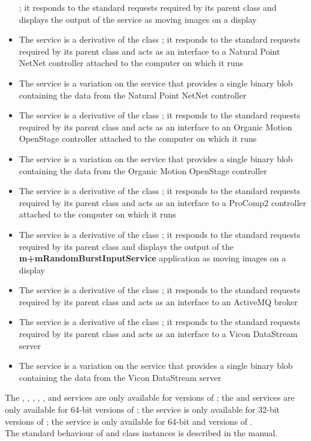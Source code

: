 \begin{itemize}
;
it responds to the standard requests required by its parent class and displays the output
of the \textbf{\LFI} service as moving images on a display
\item\exSp{}The \textbf{\NNI} service is a derivative of the \mplusm{} class
;
it responds to the standard requests required by its parent class and acts as an interface
to a Natural Point NetNet controller attached to the computer on which it runs
\item\exSp{}The \textbf{\NNBI} service is a variation on the \NNI{} service that provides
a single binary blob containing the data from the Natural Point NetNet controller
\item\exSp{}The \textbf{\OSI} service is a derivative of the \mplusm{} class
;
it responds to the standard requests required by its parent class and acts as an interface
to an Organic Motion OpenStage controller attached to the computer on which it runs
\item\exSp{}The \textbf{\OSBI} service is a variation on the \OSI{} service that provides
a single binary blob containing the data from the Organic Motion OpenStage controller
\item\exSp{}The \textbf{\PCtwoI} service is a derivative of the \mplusm{} class
;
it responds to the standard requests required by its parent class and acts as an interface
to a ProComp2 controller attached to the computer on which it runs
\item\exSp{}The \textbf{\PDO} service is a derivative of the \mplusm{} class
;
it responds to the standard requests required by its parent class and displays the output
of the \textbf{m+mRandomBurstInputService} application as moving images on a display
\item\exSp{}The \textbf{\SMO} service is a derivative of the \mplusm{} class
;
it responds to the standard requests required by its parent class and acts as an interface
to an ActiveMQ broker
\item\exSp{}The \textbf{\VDSI} service is a derivative of the \mplusm{} class
;
it responds to the standard requests required by its parent class and acts as an interface
to a Vicon DataStream server
\item\exSp{}The \textbf{\VBI} service is a variation on the \VDSI{} service that provides
a single binary blob containing the data from the Vicon DataStream server
\end{itemize}

The \KVtwoI, \KVtwoBI, \KVtwoSI, \NNI, \NNBI, \VDSI{} and \VBI{} services are only
available for \win{} versions of \mplusm;
the \OSI{} and \OSBI{} services are only available for \win{} 64-bit versions of \mplusm;
the \PCtwoI{} service is only available for \win{} 32-bit versions of \mplusm;
the \SMO{} service is only available for \win{} 64-bit and \mac{} versions of \mplusm.\\

The standard behaviour of  and 
class instances is described in the \emph{\MMM} manual.
\primaryEnd{}
